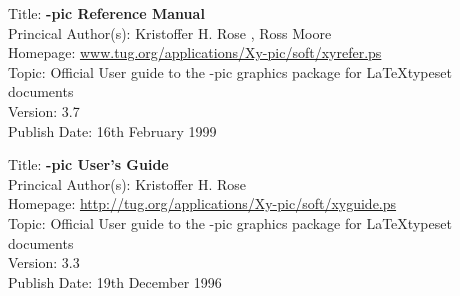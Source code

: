 Title: 	\textbf{\Xy-pic Reference Manual}	\\
Princical Author(s): 	Kristoffer H. Rose , Ross Moore \\
Homepage:	\url{www.tug.org/applications/Xy-pic/soft/xyrefer.ps} 	\\	
Topic:		Official User guide to the \Xy-pic graphics package for \LaTeX typeset documents \\
Version:		3.7 \\
Publish Date:		16th February 1999


Title: 	\textbf{\Xy-pic User's Guide}	\\
Princical Author(s): 	Kristoffer H. Rose  \\
Homepage:	\url{http://tug.org/applications/Xy-pic/soft/xyguide.ps} 	\\	
Topic:		Official User guide to the \Xy-pic graphics package for \LaTeX typeset documents \\
Version:		3.3 \\
Publish Date:		19th December 1996
